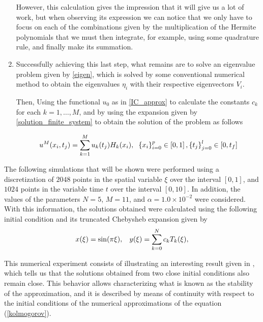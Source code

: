 \begin{enumerate}
    	However, this calculation gives the impression that it will give us a lot of work, but when observing its expression we can notice that we only have to focus on each of the combinations given by the multiplication of the Hermite polynomials that we must then integrate, for example, using some quadrature rule, and finally make its summation.
    	
    	\item Successfully achieving this last step, what remains are to solve an eigenvalue problem given by \ref{eigen}, which is solved by some conventional numerical method to obtain the eigenvalues $\eta_i$ with their respective eigenvectors $V_i$. 
    	
    	Then, Using the functional $u_0$ as in \ref{IC_approx} to calculate the constants $c_k$ for each $k = 1, \dots, M$, and by using the expansion given by \ref{solution_finite_system} to obtain the solution of the problem as follows

    	\begin{align*}
    		u^M(x_i, t_j) = \displaystyle \sum_{k=1}^{M} u_k (t_j) H_k (x_i), \hspace{2mm} \left\{x_i\right\}_{i=0}^{p} \in \left[ 0, 1 \right], \left\{t_j\right\}_{j=0}^{l} \in \left[ 0, t_f \right]
    	\end{align*}
    \end{enumerate}
    
    The following simulations that will be shown were performed using a discretization of $2048$ points in the spatial variable $\xi$ over the interval $[0, 1]$, and $1024$ points in the variable time $t$ over the interval $[0, 10]$. In addition, the values of the parameters $N = 5$, $M = 11$, and $\alpha = 1.0 \times 10^{-2}$ were considered. With this information, the solutions obtained were calculated using the following initial condition and its truncated Chebysheb expansion given by
    \begin{align*}
    	x(\xi) = \sin(\pi \xi), \hspace{3mm} y(\xi) = \displaystyle \sum^{N}_{k=0} c_k T_k (\xi),
    \end{align*}
    
    This numerical experiment consists of illustrating an interesting result given in \cite{Delgado2019}, which tells us that the solutions obtained from two close initial conditions also remain close. This behavior allows characterizing what is known as the stability of the approximation, and it is described by means of continuity with respect to the initial conditions of the numerical approximations of the equation (\ref{kolmogorov}). \\
    
